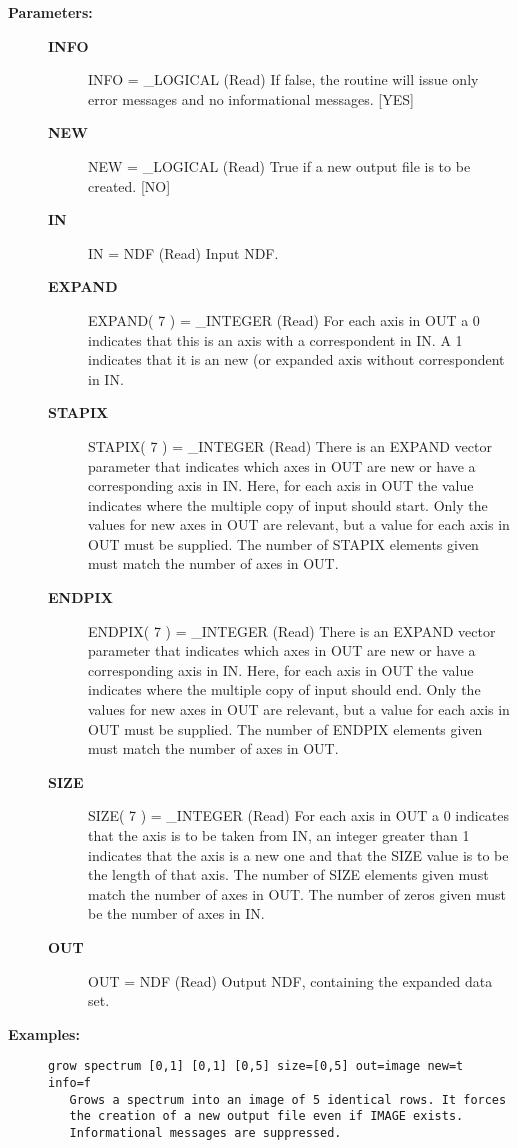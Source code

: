 \begin{description}
\item [{\bf Parameters:}]
\begin{description}
\item [{\bf INFO}]
INFO = _LOGICAL (Read)
   If false, the routine will issue only error messages and no
   informational messages. [YES]
\item [{\bf NEW}]
NEW = _LOGICAL (Read)
   True if a new output file is to be created. [NO]
\item [{\bf IN}]
IN = NDF (Read)
   Input NDF.
\item [{\bf EXPAND}]
EXPAND( 7 ) = _INTEGER (Read)
   For each axis in OUT a 0 indicates that this is an axis with a
   correspondent in IN. A 1 indicates that it is an new (or expanded
   axis without correspondent in IN.
\item [{\bf STAPIX}]
STAPIX( 7 ) = _INTEGER (Read)
   There is an EXPAND vector parameter that indicates which axes in
   OUT are new or have a corresponding axis in IN. Here, for each
   axis in OUT the value indicates where the multiple copy of input
   should start. Only the values for new axes in OUT are relevant,
   but a value for each axis in OUT must be supplied. The number of
   STAPIX elements given must match the number of axes in OUT.
\item [{\bf ENDPIX}]
ENDPIX( 7 ) = _INTEGER (Read)
   There is an EXPAND vector parameter that indicates which axes in
   OUT are new or have a corresponding axis in IN. Here, for each
   axis in OUT the value indicates where the multiple copy of input
   should end. Only the values for new axes in OUT are relevant,
   but a value for each axis in OUT must be supplied. The number of
   ENDPIX elements given must match the number of axes in OUT.
\item [{\bf SIZE}]
SIZE( 7 ) = _INTEGER (Read)
   For each axis in OUT a 0 indicates that the axis is to be taken
   from IN, an integer greater than 1 indicates that the axis is
   a new one and that the SIZE value is to be the length of that
   axis. The number of SIZE elements given must match the number
   of axes in OUT. The number of zeros given must be the number of
   axes in IN.
\item [{\bf OUT}]
OUT = NDF (Read)
   Output NDF, containing the expanded data set.
\end{description}

\item [{\bf Examples:}]
\begin{verbatim}
grow spectrum [0,1] [0,1] [0,5] size=[0,5] out=image new=t info=f
   Grows a spectrum into an image of 5 identical rows. It forces
   the creation of a new output file even if IMAGE exists.
   Informational messages are suppressed.


\end{verbatim}
\end{description}
